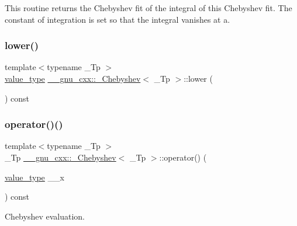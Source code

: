 This routine returns the Chebyshev fit of the integral of this Chebyshev fit. The constant of integration is set so that the integral vanishes at a. \mbox{\label{class____gnu__cxx_1_1__Chebyshev_a1f3e70e588cfc837704461d2319b1e81}} 
\subsubsection{\texorpdfstring{lower()}{lower()}}
{\footnotesize\ttfamily template$<$typename \+\_\+\+Tp $>$ \\
\hyperlink{class____gnu__cxx_1_1__Chebyshev_a7346ba5843311126dc28cb905687c4a1}{value\+\_\+type} \hyperlink{class____gnu__cxx_1_1__Chebyshev}{\+\_\+\+\_\+gnu\+\_\+cxx\+::\+\_\+\+Chebyshev}$<$ \+\_\+\+Tp $>$\+::lower (\begin{DoxyParamCaption}{ }\end{DoxyParamCaption}) const\hspace{0.3cm}{\ttfamily [inline]}}

\mbox{\label{class____gnu__cxx_1_1__Chebyshev_ab233a66fdf801389715273c560d1beb9}} 
\subsubsection{\texorpdfstring{operator()()}{operator()()}}
{\footnotesize\ttfamily template$<$typename \+\_\+\+Tp $>$ \\
\+\_\+\+Tp \hyperlink{class____gnu__cxx_1_1__Chebyshev}{\+\_\+\+\_\+gnu\+\_\+cxx\+::\+\_\+\+Chebyshev}$<$ \+\_\+\+Tp $>$\+::operator() (\begin{DoxyParamCaption}\item[{\hyperlink{class____gnu__cxx_1_1__Chebyshev_a7346ba5843311126dc28cb905687c4a1}{value\+\_\+type}}]{\+\_\+\+\_\+x }\end{DoxyParamCaption}) const}

Chebyshev evaluation. \mbox{\label{class____gnu__cxx_1_1__Chebyshev_a21041ae006b9d2c881868f0fe759ad05}} 
